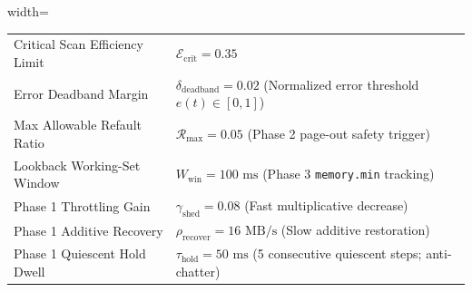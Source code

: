\begin{table}[t]
\begin{adjustbox}{width=\textwidth}
\begin{tabular}{ll}
Critical Scan Efficiency Limit & $\mathcal{E}_{\text{crit}} = 0.35$ \\
Error Deadband Margin & $\delta_{\text{deadband}} = 0.02$ (Normalized error threshold $e(t) \in [0, 1]$) \\
Max Allowable Refault Ratio & $\mathcal{R}_{\text{max}} = 0.05$ (Phase 2 page-out safety trigger) \\
Lookback Working-Set Window & $W_{\text{win}} = 100\text{ ms}$ (Phase 3 \texttt{memory.min} tracking) \\
Phase 1 Throttling Gain & $\gamma_{\text{shed}} = 0.08$ (Fast multiplicative decrease) \\
Phase 1 Additive Recovery & $\rho_{\text{recover}} = 16\text{ MB/s}$ (Slow additive restoration) \\
Phase 1 Quiescent Hold Dwell & $\tau_{\text{hold}} = 50\text{ ms}$ (5 consecutive quiescent steps; anti-chatter) \\
\bottomrule
\end{tabular}
\end{adjustbox}
\end{table}
